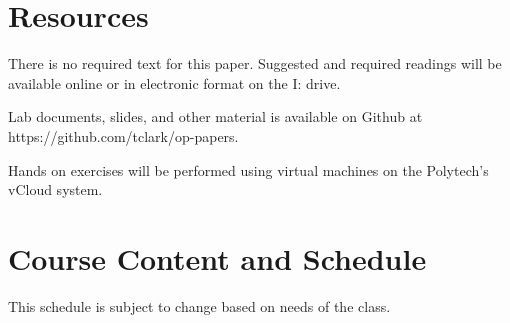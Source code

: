 \documentclass{article}
\begin{document}
\section*{Resources}
There is no required text for this paper.  Suggested and required readings will be available online or in electronic format on the I: drive.

Lab documents, slides, and other material is available on Github at https://github.com/tclark/op-papers.

Hands on exercises will be performed using virtual machines on the Polytech's vCloud system.

\newpage 

\section*{Course Content and Schedule}
This schedule is subject to change based on needs of the class.
\end{document}
